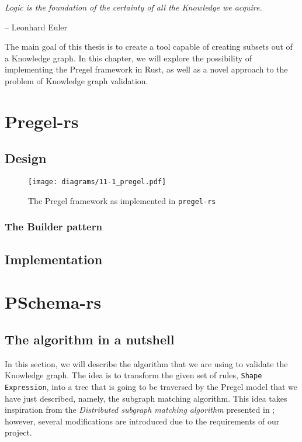\epigraph{\textit{Logic is the foundation of the certainty of all the Knowledge we acquire.}}{-- \textup{Leonhard Euler}}

The main goal of this thesis is to create a tool capable of creating subsets out of a Knowledge graph. In this chapter, we will explore the possibility of implementing the Pregel framework in Rust, as well as a novel approach to the problem of Knowledge graph validation.

\section{Pregel-rs}

\subsection{Design}

\begin{figure}[ht]
    \centering
    \texttt{[image: diagrams/11-1\_pregel.pdf]}
    \caption{The Pregel framework as implemented in \texttt{pregel-rs}}
\end{figure}

\subsubsection{The Builder pattern}

\subsection{Implementation}

\section{PSchema-rs}

\subsection{The algorithm in a nutshell}

In this section, we will describe the algorithm that we are using to validate the Knowledge graph. The idea is to transform the given set of rules, \texttt{Shape} \texttt{Expression}, into a tree that is going to be traversed by the Pregel model that we have just described, namely, the subgraph matching algorithm. This idea takes inspiration from the \textit{Distributed subgraph matching algorithm} presented in \cite{Xu2019}; however, several modifications are introduced due to the requirements of our project.

